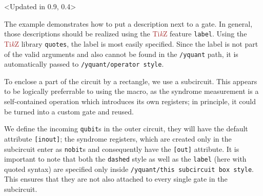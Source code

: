\documentclass{scrartcl}
\makeatletter
\newenvironment{codeexample*}{%
   \VerbatimEnvironment%
   \let\FVB@VerbatimOut\minted@FVB@VerbatimOut
   \let\FVE@VerbatimOut\minted@FVE@VerbatimOut
   \minted@configlang{tex}%
   \minted@fvset
   \begin{VerbatimOut}[codes={\catcode`\^^I=12},firstline,lastline]{\minted@jobname.pyg}%
}{
   \end{VerbatimOut}%
   \minted@langlinenoson%
   \begin{adjustbox}{center}
       \minted@jobname.pyg %
   \end{adjustbox}\nopagebreak
   \expandafter\minted@pygmentize\expandafter{\minted@lang}%
   \minted@langlinenosoff%
   \par%
}
\def\TikZ{\textcolor{brown}{Ti\textit kZ}}
\def\ttlink{\link\texttt}
\def\texlink{\link\tex}
\makeatother
\begin{document}
            \begin{example}<Updated in 0.9, 0.4>
               \begin{codeexample*}
               \end{codeexample*}
               The example demonstrates how to put a description next to a gate.
               In general, those descriptions should be realized using the \TikZ{} feature \texttt{label}.
               Using the \TikZ{} library \texttt{quotes}, the label is most easily specified.
               Since the label is not part of the valid arguments and also cannot be found in the \texttt{/yquant} path, it is automatically passed to \ttlink{/yquant/operator style}.

               To enclose a part of the circuit by a rectangle, we use a subcircuit.
               This appears to be logically preferrable to using the \texlink{\enclose} macro, as the syndrome measurement is a self-contained operation which introduces its own registers; in principle, it could be turned into a custom gate and reused.

               We define the incoming \ttlink{qubit}s in the outer circuit, they will have the default attribute \ttlink{[inout]}; the syndrome registers, which are created only in the subcircuit enter as \ttlink{nobit}s and consequently have the \ttlink{[out]} attribute.
               It is important to note that both the \texttt{dashed} style as well as the \texttt{label} (here with quoted syntax) are specified only inside \ttlink{/yquant/this subcircuit box style}.
               This ensures that they are not also attached to every single gate in the subcircuit.


\end{example}
\end{document}

